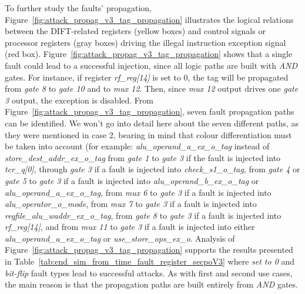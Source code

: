 To further study the faults' propagation, Figure~\ref{fig:attack_propag_v3_tag_propagation} illustrates the logical relations between the DIFT-related registers (yellow boxes) and control signals or processor registers (gray boxes) driving the illegal instruction exception signal (red box).
Figure~\ref{fig:attack_propag_v3_tag_propagation} shows that a single fault could lead to a successful injection, since all logic paths are built with \textit{AND} gates. For instance, if register \textit{rf\_reg[14]} is set to 0, the tag will be propagated from \textit{gate 8} to \textit{gate 10} and to \textit{mux 12}. Then, since \textit{mux 12} output drives one \textit{gate 3} output, the exception is disabled.
From Figure~\ref{fig:attack_propag_v3_tag_propagation}, seven fault propagation paths can be identified. We won't go into detail here about the seven different paths, as they were mentioned in case 2, bearing in mind that colour differentiation must be taken into account (for example: \textit{alu\_operand\_a\_ex\_o\_tag} instead of \textit{store\_dest\_addr\_ex\_o\_tag}
from \textit{gate 1} to \textit{gate 3} if the fault is injected into \textit{tcr\_q[0]},
through \textit{gate 3} if a fault is injected into \textit{check\_s1\_o\_tag},
from \textit{gate 4} or \textit{gate 5} to \textit{gate 3} if a fault is injected into \textit{alu\_operand\_b\_ex\_o\_tag} or \textit{alu\_operand\_a\_ex\_o\_tag},
from \textit{mux 6} to \textit{gate 3} if a fault is injected into \textit{alu\_operator\_o\_mode},
from \textit{mux 7} to \textit{gate 3} if a fault is injected into \textit{regfile\_alu\_waddr\_ex\_o\_tag}, from \textit{gate 8} to \textit{gate 3} if a fault is injected into \textit{rf\_reg[14]}, and
from \textit{mux 11} to \textit{gate 3} if a fault is injected into either \textit{alu\_operand\_a\_ex\_o\_tag} or \textit{use\_store\_ops\_ex\_o}.
Analysis of Figure~\ref{fig:attack_propag_v3_tag_propagation} supports the results presented in Table~\ref{tab:end_sim_from_time_fault_register_secpoV3} where \textit{set to 0} and \textit{bit-flip} fault types lead to successful attacks. As with first and second use cases, the main reason is that the propagation paths are built entirely from \textit{AND} gates.

